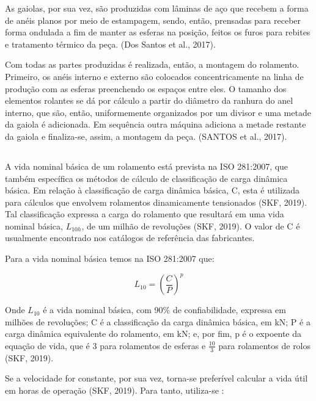 \documentclass[
	12pt,				
	oneside,			
	a4paper,			
	english,			
	brazil,			
	]{abntex2ppgsi}
\begin{document}
As gaiolas, por sua vez, são produzidas com lâminas de aço que recebem a forma de anéis planos por meio de estampagem, sendo, então, prensadas para receber forma ondulada a fim de manter as esferas na posição, feitos os furos para rebites e tratamento térmico da peça. (Dos Santos et al., 2017).
 
Com todas as partes produzidas é realizada, então, a montagem do rolamento. Primeiro, os anéis interno e externo são colocados concentricamente na linha de produção com as esferas preenchendo os espaços entre eles. O tamanho dos elementos rolantes se dá por cálculo a partir do diâmetro da ranhura do anel interno, que são, então, uniformemente organizados por um divisor e uma metade da gaiola é adicionada. Em sequência outra máquina adiciona a metade restante da gaiola e finaliza-se, assim, a montagem da peça. (SANTOS et al., 2017). 

\subsection{}

A vida nominal básica de um rolamento está prevista na ISO 281:2007, que também específica os métodos de cálculo de classificação de carga dinâmica básica. Em relação à classificação de carga dinâmica básica, C, esta é utilizada para cálculos que envolvem rolamentos dinamicamente tensionados (SKF, 2019). Tal classificação expressa a carga do rolamento que resultará em uma vida nominal básica, $L_{10h}$, de um milhão de revoluções (SKF, 2019). O valor de C é usualmente encontrado nos catálogos de referência das fabricantes.   

Para a vida nominal básica temos na ISO 281:2007 que:

\begin{equation}
	L_{10}= \left ( \frac{C}{P} \right )^{p}
	\label{eq: Vida Nominal Básica}
\end{equation}

Onde $L_{10}$ é a vida nominal básica, com 90\% de confiabilidade, expressa em milhões de revoluções; C é a classificação da carga dinâmica básica, em kN; P é a carga dinâmica equivalente do rolamento, em kN; e, por fim, p é o expoente da equação de vida, que é 3 para rolamentos de esferas e $ \frac{10}{3}$ para rolamentos de rolos (SKF, 2019).

Se a velocidade for constante, por sua vez, torna-se preferível calcular a vida útil em horas de operação (SKF, 2019). Para tanto, utiliza-se :
\end{document}
